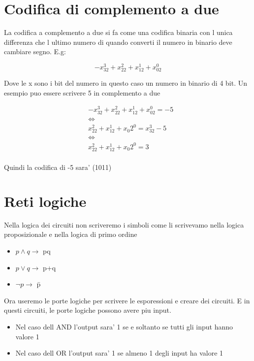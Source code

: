 \documentclass{article}
\begin{document}
         \section{Codifica di complemento a due}
         \begin{flushleft}
          La codifica a complemento a due si fa come una codifica binaria con l unica differenza che l ultimo numero di quando converti il numero
           in binario deve cambiare segno. E.g:
         \end{flushleft}
         \begin{equation}
          -x_32^3+x_22^2+x_12^1+x_02^0
         \end{equation}
         \begin{flushleft}
          Dove le x sono i bit del numero in questo caso un numero in binario di 4 bit. Un esempio puo essere scrivere 5 in complemento a due
         \end{flushleft}
         \begin{equation}
           \begin{split}
             & -x_32^3+x_22^2+  x_12^1+x_02^0=-5 \\ 
              & \iff \\  
              & x_22^2+x_12^1+x_0  2^0=x_32^3-5 \\ 
              & \iff \\
              & x_22^2+x_12^1+x_0  2^0=3 \\ 
           \end{split}
         \end{equation}
         \begin{flushleft}
           Quindi la codifica di -5 sara' (1011)
         \end{flushleft}
          \section{Reti logiche}
          \begin{flushleft}
            Nella logica dei circuiti non scriveremo i simboli come li scrivevamo nella logica proposizionale  e nella logica di primo ordine
          \end{flushleft}
          \begin{itemize}
            \item $ p \land q \to$ pq
            \item $ p \lor q \to$ p+q
            \item $ \neg p \to$ \= p
          \end{itemize}
          \begin{flushleft}
            Ora useremo le porte logiche per scrivere le esporessioni e creare dei circuiti. E in questi circuiti, le porte logiche
            possono avere piu input.
          \end{flushleft}
          \begin{itemize}
            \item Nel caso dell AND l'output sara' 1 se e soltanto se tutti gli input hanno valore 1
            \item Nel caso dell OR l'output sara' 1 se almeno 1 degli input ha valore 1
          \end{itemize}
\end{document}
